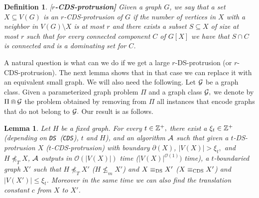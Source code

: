 \documentclass[11pt]{article}
\newtheorem{lemma}{Lemma}
\newtheorem{definition}{Definition}
\newcommand{\tDS}{{\texttt{\sc DS}}}
\newcommand{\tCDS}{{\texttt{\sc CDS}}}
\newcommand{\cO}{\mathcal{O}}
\begin{document}
\begin{definition}{\rm [\bf $r$-{\sc CDS}-protrusion]} 
 Given a graph $G$, we say that a set $X\subseteq V(G)$ is an {\em $r$-{\sc CDS}-protrusion} of $G$ if 
   the number of vertices in $X$ with a neighbor in $V(G)\setminus X$ is at most $r$ and there exists a 
   subset $S\subseteq X$ of size at most $r$ such that  for every connected component $C$ of $G[X]$ we have that 
    $S\cap C$ is connected and is a dominating set for $C$. 
    \end{definition}

A natural question is what can we do if we get a large $r$-{\sc DS}-protrusion (or $r$-{\sc CDS}-protrusion).  The next lemma shows that in that case we can replace it with an equivalent small graph. 
We will also need the following. Let ${\cal G}$ be a graph class.  Given a  parameterized graph problem  $\Pi$ and a graph class ${\cal G},$ 
we denote by $\Pi\doublecap {\cal G}$ the problem obtained by 
removing from $\Pi$ all instances that 
encode graphs that do not belong to ${\cal G}.$  Our result is as follows. 






\begin{lemma}
\label{lem:fiidomset}
Let $H$ be a fixed graph. For  every $t\in\Bbb{Z}^{+},$ there exist a $\xi_t\in\Bbb{Z}^{+}$ (depending on \tDS \, (\tCDS), $t$ and $H$),  and 
an algorithm $\cal A$ such that given a $t$-{\sc DS}-protrusion $X$ ($t$-{\sc CDS}-protrusion) with boundary  
$\partial(X)$, $|V(X)|>\xi_t,$ and $H\not\preceq_T X$, 
$\cal A$ outputs in   $\cO(|V(X)|)$ time ($|V(X)|^{\cO(1)})$ time),  
a $t$-boundaried graph  $X'$ such that  $H\not\preceq_T X'$ ($H\not\leq_m X'$) and  $X\equiv_{\tDS}X'$ ($X\equiv_{\tCDS}X'$) and $|V(X')|\leq \xi_t$. Moreover in the same time 
we can also find the translation constant $c$ from $X$  to $X'$. 



\end{lemma}
\end{document}
